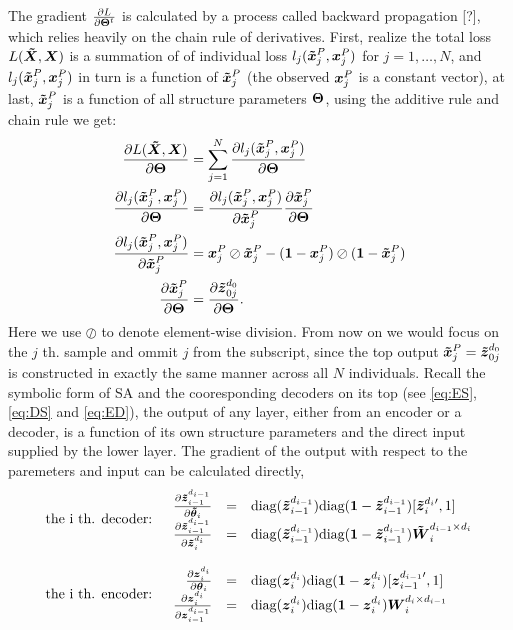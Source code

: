 The gradient $\PDV{L}{\Par^t}$ is calculated by a process called backward propagation [?], which relies heavily on the chain rule of derivatives. First, realize the total loss $L(\XDC, \XEC)$ is a summation of  of individual loss $l_j(\xDC_j^P, \xEC_j^P)$ for $j=1, \dots, N$, and $l_j(\xDC_j^P, \xEC_j^P)$ in turn is a function of $\xDC_j^P$ (the observed $\xEC_j^P$ is a constant vector), at last, $\xDC_j^P$ is a function of all structure parameters $\Par$, using the additive rule and chain rule we get:
\begin{equation*}
\begin{split}
  \PDV{L(\XDC, \XEC)}{\Par} &= \sum_{j=1}^{N}\PDV{l_j(\xDC_j^P, \xEC_j^P)}{\Par} \\
  \PDV{l_j(\xDC_j^P, \xEC_j^P)}{\Par} &= \PDV{l_j(\xDC_j^P, \xEC_j^P)}{\xDC_j^P} \PDV{\xDC_j^P}{\Par} \\
  \PDV{l_j(\xDC_j^P, \xEC_j^P)}{\xDC_j^P} &= \xEC_j^P \oslash \xDC_j^P -  (\one - \xEC_j^P) \oslash (\one - \xDC_j^P) \\
  \PDV{\xDC_j^P}{\Par} &= \PDV{\zDC_{0j}^{d_0}}{\Par}.
\end{split}
\end{equation*}
Here we use $\oslash$ to denote element-wise division. From now on we would focus on the $j$ th. sample and ommit $j$ from the subscript, since the top output $\xDC_j^P = \zDI{0j}{0}$ is constructed in exactly the same manner across all $N$ individuals. Recall the symbolic form of SA and the cooresponding decoders on its top (see \ref{eq:ES}, \ref{eq:DS} and \ref{eq:ED}), the output of any layer, either from an encoder or a decoder, is a function of its own structure parameters and the direct input supplied by the lower layer. The gradient of the output with respect to the paremeters and input can be calculated directly,
\begin{equation}\label{eq:GD}
  \begin{split}\
    \begin{array}{rl}
      \textrm{the i th. decoder:} & \begin{array}{rcl}
        \PDV{\zDI{i-1}{i-1}}{\pDC_i} & = & \diag{\zDI{i-1}{i-1}} \diag{\one{} - \zDI{i-1}{i-1}} [\zDIt{i}{i}, 1] \\
        \PDV{\zDI{i-1}{i-1}}{\zDI{i}{i}} & = & \diag{\zDI{i-1}{i-1}} \diag{\one{} - \zDI{i-1}{i-1}} \WDI{i}{i-1}{i} \\
      \end{array} \\ \\
      \textrm{the i th. encoder:} & \begin{array}{rcl}
        \PDV{\zEI{i}{i}}{\pEC_i} & = & \diag{\zEI{i}{i}}\diag{\one - \zEI{i}{i}} [\zEIt{i-1}{i-1}, 1] \\
        \PDV{\zEI{i}{i}}{\zEI{i-1}{i-1}} & = &  \diag{\zEI{i}{i}} \diag{\one - \zEI{i}{i}} \WEI{i}{i}{i-1}\\
      \end{array}
    \end{array}
  \end{split}
\end{equation}

